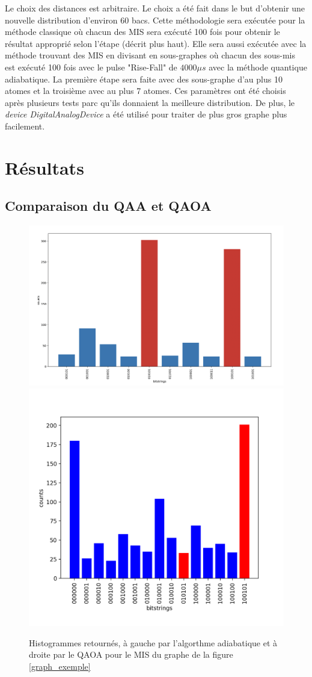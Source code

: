 \documentclass[11pt]{article}
\begin{document}
Le choix des distances est arbitraire. Le choix a été fait dans le but d'obtenir une nouvelle distribution d'environ 60 bacs.
Cette méthodologie sera exécutée pour la méthode classique où chacun des MIS sera exécuté 100 fois pour obtenir le résultat approprié selon l'étape (décrit plus haut).
Elle sera aussi exécutée avec la méthode trouvant des MIS en divisant en sous-graphes où chacun des sous-mis est exécuté 100 fois avec le pulse  "Rise-Fall" de $4000 \mu s$ avec la méthode quantique adiabatique. La première étape sera faite avec des sous-graphe d'au plus 10 atomes et la troisième avec au plus 7 atomes. Ces paramètres ont été choisis après plusieurs tests parc qu'ils donnaient la meilleure distribution. De plus, le \textit{device DigitalAnalogDevice} a été utilisé pour traiter de plus gros graphe plus facilement.



\section{Résultats}
\subsection{Comparaison du QAA et QAOA}
\begin{figure}[H]
    \centering
    \includegraphics[width = 0.50\linewidth]{images/histo_qaa_exemple.png}
    \includegraphics[width=0.45\linewidth]{images/qaoa_res.png}
    \caption{Histogrammes retournés, à gauche par l'algorthme adiabatique et à droite par le QAOA pour le MIS du graphe de la figure \ref{graph_exemple}}
    \label{qaoavsqaa}
\end{figure}
\end{document}
